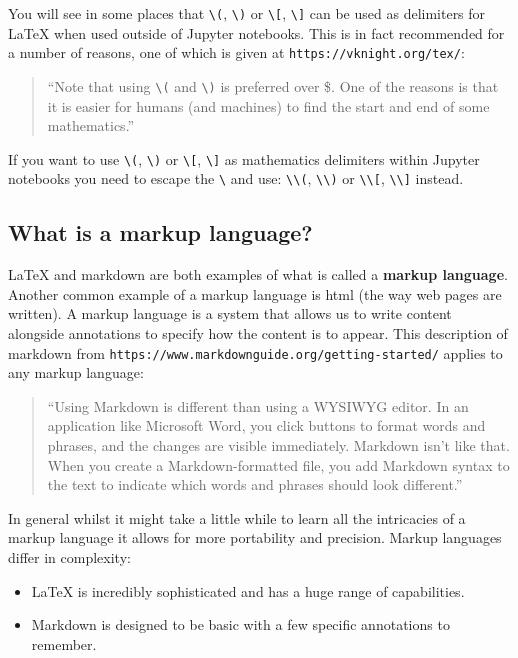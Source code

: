 You will see in some places that \texttt{\textbackslash(},
\texttt{\textbackslash)} or \texttt{\textbackslash[},
\texttt{\textbackslash]} can be used as delimiters for
\LaTeX\; when used outside of Jupyter notebooks. This is in fact recommended for a
number of reasons, one of which is given at
\texttt{https://vknight.org/tex/}:

\begin{quote}
``Note that using \texttt{\textbackslash(} and \texttt{\textbackslash)} is preferred over \$. One of the reasons is that it
is easier for humans (and machines) to find the start and end of some
mathematics.''
\end{quote}

\begin{note}
If you want to use \texttt{\textbackslash(}, \texttt{\textbackslash)} or
\texttt{\textbackslash[}, \texttt{\textbackslash]} as
mathematics delimiters within Jupyter notebooks you need to escape the
\texttt{\textbackslash} and use: \texttt{\textbackslash\textbackslash(},
\texttt{\textbackslash\textbackslash)} or
\texttt{\textbackslash\textbackslash[},
\texttt{\textbackslash\textbackslash]} instead.
\end{note}

\subsection{What is a markup language?}
\label{\detokenize{tools-for-mathematics/01-using-notebooks/why/main:what-is-a-markup-language}}

\LaTeX\; and markdown are both examples of what is called a \textbf{markup language}.
Another common example of a markup language is html (the way web pages are
written).
A markup language is a system that allows us to write content alongside
annotations to specify how the content is to appear.
This description of markdown from
\texttt{https://www.markdownguide.org/getting-started/} applies
to any markup language:

\begin{quote}
``Using Markdown is different than using a WYSIWYG editor. In an application
like Microsoft Word, you click buttons to format words and phrases, and the
changes are visible immediately. Markdown isn’t like that. When you create a
Markdown-formatted file, you add Markdown syntax to the text to indicate which
words and phrases should look different.''
\end{quote}

In general whilst it might take a little while to learn all the intricacies of a
markup language it allows for more portability and precision.
Markup languages differ in complexity:

\begin{itemize}
\item 
\LaTeX\; is incredibly sophisticated and has a huge range of capabilities.

\item 
Markdown is designed to be basic with a few specific annotations to remember.

\end{itemize}
